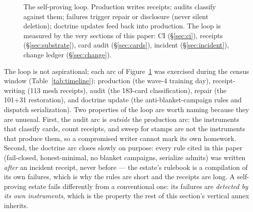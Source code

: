 ﻿\documentclass[11pt]{article}
\begin{document}
\begin{figure}[htbp]
\centering
{}
\caption{The self-proving loop. Production writes receipts; audits classify against them; failures trigger repair or disclosure (never silent deletion); doctrine updates feed back into production. The loop is measured by the very sections of this paper: CI (\S\ref{sec:ci}), receipts (\S\ref{sec:substrate}), card audit (\S\ref{sec:cards}), incident (\S\ref{sec:incident}), change ledger (\S\ref{sec:change}).}
\label{fig:loop}
\end{figure}

The loop is not aspirational; each arc of Figure~\ref{fig:loop} was exercised during the census window (Table~\ref{tab:timeline}): production (the wave-4 training day), receipt-writing (113 mesh receipts), audit (the 183-card classification), repair (the 101+31 restoration), and doctrine update (the anti-blanket-campaign rules and dispatch serialization). Two properties of the loop are worth naming because they are unusual. First, the audit arc is \emph{outside} the production arc: the instruments that classify cards, count receipts, and sweep for stamps are not the instruments that produce them, so a compromised writer cannot mark its own homework. Second, the doctrine arc closes slowly on purpose: every rule cited in this paper (fail-closed, honest-minimal, no blanket campaigns, serialize admits) was written \emph{after} an incident receipt, never before --- the estate's rulebook is a compilation of its own failures, which is why the rules are short and the receipts are long. A self-proving estate fails differently from a conventional one: its failures are \emph{detected by its own instruments}, which is the property the rest of this section's vertical annex inherits.
\end{document}
